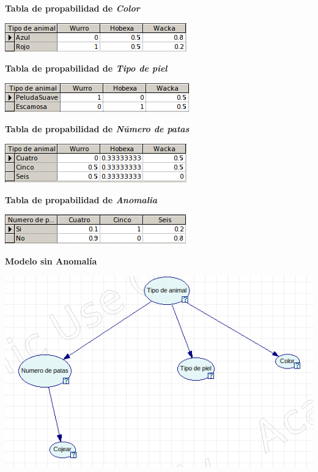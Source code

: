 \documentclass{article}
\begin{document}
\textbf{Tabla de propabilidad de \textit{Color}}

\begin{center}
\includegraphics[scale=0.5]{Color.png}
\end{center}

\textbf{Tabla de propabilidad de \textit{Tipo de piel}}

\begin{center}
\includegraphics[scale=0.5]{piel.png}
\end{center}

\textbf{Tabla de propabilidad de \textit{Número de patas}}

\begin{center}
\includegraphics[scale=0.5]{Patas.png}
\end{center}

\textbf{Tabla de propabilidad de \textit{Anomalia}}

\begin{center}
\includegraphics[scale=0.5]{Anomalia.png}
\end{center}

\newpage

\textbf{Modelo sin Anomalía}

\begin{center}
\includegraphics[scale=0.5]{Modelo2b.png}
\end{center}
\end{document}
